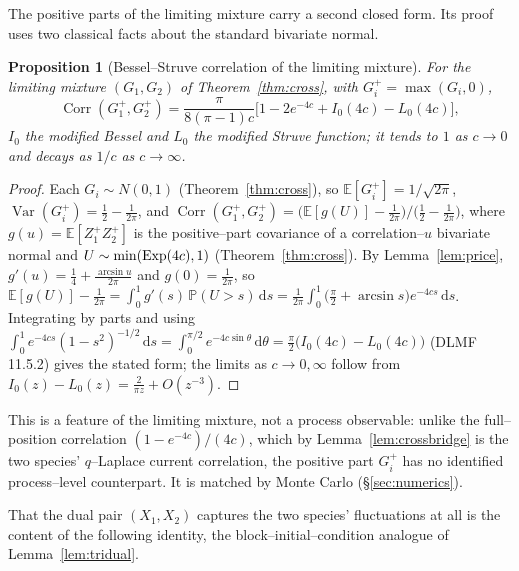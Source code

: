 \documentclass[11pt]{article}
\theoremstyle{plain}
\newtheorem{proposition}[theorem]{Proposition}
\theoremstyle{definition}
\theoremstyle{remark}
\DeclareMathOperator{\Var}{Var}\DeclareMathOperator{\Cov}{Cov}
\DeclareMathOperator{\Corr}{Corr}\DeclareMathOperator{\cum}{cum}
\newcommand{\E}{\mathbb{E}}\newcommand{\PP}{\mathbb{P}}\newcommand{\dd}{\,\mathrm{d}}
\begin{document}
The positive parts of the limiting mixture carry a second closed form. Its proof
uses two classical facts about the standard bivariate normal.

\begin{proposition}[Bessel--Struve correlation of the limiting mixture]\label{prop:struve}
For the limiting mixture $(G_1,G_2)$ of Theorem~\ref{thm:cross}, with $G_i^+=\max(G_i,0)$,
\[
  \Corr(G_1^+,G_2^+)=\frac{\pi}{8(\pi-1)c}\big[1-2e^{-4c}+I_0(4c)-L_0(4c)\big],
\]
$I_0$ the modified Bessel and $L_0$ the modified Struve function; it tends to $1$ as
$c\to0$ and decays as $1/c$ as $c\to\infty$.
\end{proposition}
\begin{proof}
Each $G_i\sim N(0,1)$ (Theorem~\ref{thm:cross}), so $\E[G_i^+]=1/\sqrt{2\pi}$,
$\Var(G_i^+)=\tfrac12-\tfrac1{2\pi}$, and
$\Corr(G_1^+,G_2^+)=\big(\E[g(U)]-\tfrac1{2\pi}\big)\big/\big(\tfrac12-\tfrac1{2\pi}\big)$,
where $g(u)=\E[Z_1^+Z_2^+]$ is the positive--part covariance of a correlation--$u$
bivariate normal and $U\sim\min(\mathrm{Exp}(4c),1)$ (Theorem~\ref{thm:cross}). By
Lemma~\ref{lem:price}, $g'(u)=\tfrac14+\tfrac{\arcsin u}{2\pi}$ and $g(0)=\tfrac1{2\pi}$,
so $\E[g(U)]-\tfrac1{2\pi}=\int_0^1 g'(s)\,\PP(U>s)\dd s
=\tfrac1{2\pi}\int_0^1\big(\tfrac\pi2+\arcsin s\big)e^{-4cs}\dd s$. Integrating by parts and
using $\int_0^1 e^{-4cs}(1-s^2)^{-1/2}\dd s=\int_0^{\pi/2}e^{-4c\sin\theta}\dd\theta
=\tfrac\pi2\big(I_0(4c)-L_0(4c)\big)$ (DLMF 11.5.2) gives the stated form; the limits as
$c\to0,\infty$ follow from $I_0(z)-L_0(z)=\tfrac2{\pi z}+O(z^{-3})$.
\end{proof}

This is a feature of the limiting mixture, not a process observable: unlike the
full--position correlation $(1-e^{-4c})/(4c)$, which by Lemma~\ref{lem:crossbridge} is the
two species' $q$--Laplace current correlation, the positive part $G_i^+$ has no
identified process--level counterpart. It is matched by Monte Carlo (\S\ref{sec:numerics}).

That the dual pair $(X_1,X_2)$ captures the two species' fluctuations at all is the
content of the following identity, the block--initial--condition analogue of
Lemma~\ref{lem:tridual}.
\end{document}
